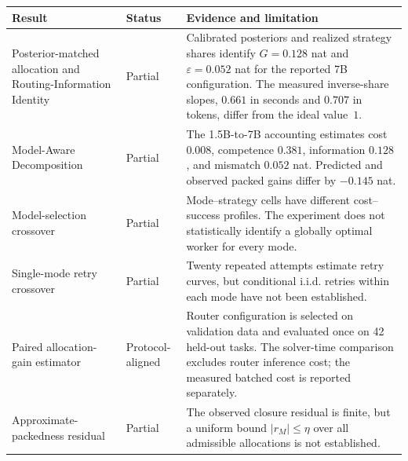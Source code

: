 \begin{center}
\small
\renewcommand{\arraystretch}{1.2}
\begin{tabular}{@{}p{4.2cm}p{3.1cm}p{8.2cm}@{}}
\toprule
\textbf{Result} & \textbf{Status} & \textbf{Evidence and limitation} \\
\midrule
Posterior-matched allocation and Routing-Information Identity
& Partial
& Calibrated posteriors and realized strategy shares identify $G=0.128$ nat
and $\varepsilon=0.052$ nat for the reported 7B configuration.  The measured
inverse-share slopes, $0.661$ in seconds and $0.707$ in tokens, differ from the
ideal value~$1$. \\

Model-Aware Decomposition
& Partial
& The 1.5B-to-7B accounting estimates cost $0.008$, competence $0.381$,
information $0.128$, and mismatch $0.052$ nat.  Predicted and observed packed
gains differ by $-0.145$ nat. \\

Model-selection crossover
& Partial
& Mode--strategy cells have different cost--success profiles.  The experiment
does not statistically identify a globally optimal worker for every mode. \\

Single-mode retry crossover
& Partial
& Twenty repeated attempts estimate retry curves, but conditional i.i.d.
retries within each mode have not been established. \\

Paired allocation-gain estimator
& Protocol-aligned
& Router configuration is selected on validation data and evaluated once on 42
held-out tasks.  The solver-time comparison excludes router inference cost;
the measured batched cost is reported separately. \\

Approximate-packedness residual
& Partial
& The observed closure residual is finite, but a uniform bound
$|r_M|\le\eta$ over all admissible allocations is not established. \\
\bottomrule
\end{tabular}
\end{center}
